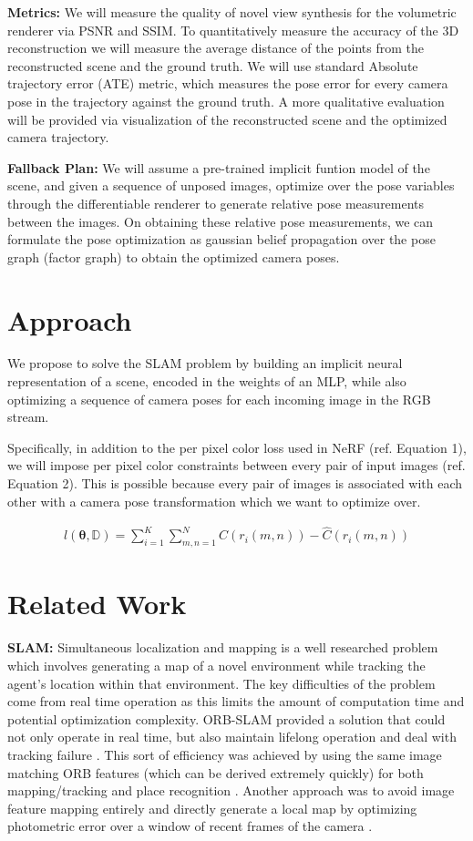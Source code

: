 \documentclass[15pt,letterpaper]{article}
\newcommand{\Db}{\mathbb{D}}
\newcommand{\thetav     }{\boldsymbol \theta     }
\begin{document}
{\bf Metrics:} We will measure the quality of novel view synthesis for the volumetric renderer via PSNR and SSIM. To quantitatively measure the accuracy of the 3D reconstruction we will measure the average distance of the points from the reconstructed scene and the ground truth. We will use standard Absolute trajectory error (ATE) metric, which measures the pose error for every camera pose in the trajectory against the ground truth. A more qualitative evaluation will be provided via visualization of the reconstructed scene and the optimized camera trajectory.

\textbf{Fallback Plan:} We will assume a pre-trained implicit funtion model of the scene, and given a sequence of unposed images, optimize over the pose variables through the differentiable renderer to generate relative pose measurements between the images. On obtaining these relative pose measurements, we can formulate the pose optimization as gaussian belief propagation over the pose graph (factor graph) to obtain the optimized camera poses.

\section{Approach}%
\label{sec:Approach}

We propose to solve the SLAM problem by building an implicit neural representation of a scene, encoded in the weights of an MLP, while also optimizing a sequence of camera poses for each incoming image in the RGB stream.

Specifically, in addition to the per pixel color loss used in NeRF (ref. Equation 1), we will impose per pixel color constraints between every pair of input images (ref. Equation 2). This is possible because every pair of images is associated with each other with a camera pose transformation which we want to optimize over.

\begin{align}
    l(\thetav, \Db) = \sum_{i = 1}^{K} \sum_{m,n = 1}^{N} C(r_i(m, n)) - \hat{C}(r_i(m,n))
\end{align}

\section{Related Work}%
\label{sec:Related Work}
{\bf SLAM:}
Simultaneous localization and mapping is a well researched problem which involves generating a map of a novel environment while tracking the agent's location within that environment. The key difficulties of the problem come from real time operation as this limits the amount of computation time and potential optimization complexity. ORB-SLAM provided a solution that could not only operate in real time, but also maintain lifelong operation and deal with tracking failure \cite{orb_slam}. This sort of efficiency was achieved by using the same image matching ORB features (which can be derived extremely quickly) for both mapping/tracking and place recognition \cite{orb}. Another approach was to avoid image feature mapping entirely and directly generate a local map by optimizing photometric error over a window of recent frames of the camera \cite{direct_odometry}.
\end{document}
